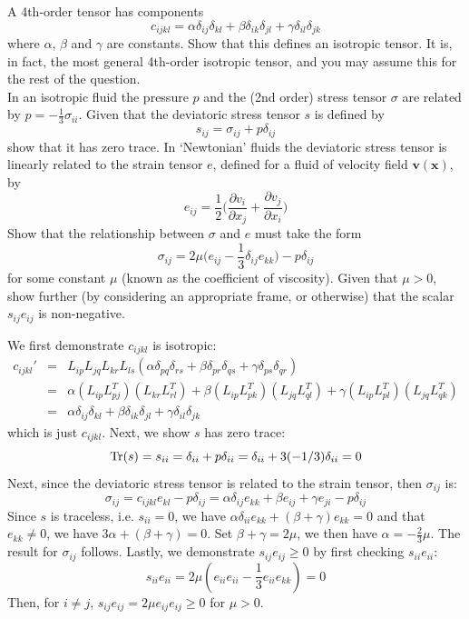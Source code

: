 \documentclass[a4paper]{article}
\begin{document}
\begin{qns}
A 4th-order tensor has components
$$c_{ijkl}=\alpha\delta_{ij}\delta_{kl}+\beta\delta_{ik}\delta_{jl}+\gamma\delta_{il}\delta_{jk}$$
where $\alpha$, $\beta$ and $\gamma$ are constants. Show that this defines an isotropic tensor. It is, in fact, the most general 4th-order isotropic tensor, and you may assume this for the rest of the question.\\[5pt]
In an isotropic fluid the pressure $p$ and the (2nd order) stress tensor $\sigma$ are related by $p=-\frac{1}{3}\sigma_{ii}$. Given that the deviatoric stress tensor $s$ is defined by
$$s_{ij}=\sigma_{ij}+p\delta_{ij}$$
show that it has zero trace. In `Newtonian' fluids the deviatoric stress tensor is linearly related to the strain tensor $e$, defined for a fluid of velocity field $\mathbf{v}(\mathbf{x})$, by
$$e_{ij}=\frac{1}{2}\bigg(\frac{\partial v_i}{\partial x_j}+\frac{\partial v_j}{\partial x_i}\bigg)$$
Show that the relationship between $\sigma$ and $e$ must take the form
$$\sigma_{ij}=2\mu\bigg(e_{ij}-\frac{1}{3}\delta_{ij}e_{kk}\bigg)-p\delta_{ij}$$
for some constant $\mu$ (known as the coefficient of viscosity). Given that $\mu>0$, show further (by considering an appropriate frame, or otherwise) that the scalar $s_{ij}e_{ij}$ is non-negative.
\end{qns}
\newpage
\begin{ans}
We first demonstrate $c_{ijkl}$ is isotropic:
\begin{eqnarray}
c_{ijkl}'&=&L_{ip}L_{jq}L_{kr}L_{ls}(\alpha\delta_{pq}\delta_{rs}+\beta\delta_{pr}\delta_{qs}+\gamma\delta_{ps}\delta_{qr})\nonumber\\&=&\alpha(L_{ip}L_{pj}^T)(L_{kr}L_{rl}^T)+\beta(L_{ip}L_{pk}^T)(L_{jq}L_{ql}^T)+\gamma(L_{ip}L_{pl}^T)(L_{jq}L_{qk}^T)\nonumber\\&=&\alpha\delta_{ij}\delta_{kl}+\beta\delta_{ik}\delta_{jl}+\gamma\delta_{il}\delta_{jk}\nonumber
\end{eqnarray}
which is just $c_{ijkl}$. Next, we show $s$ has zero trace:
$$\operatorname{Tr}(s)=s_{ii}=\delta_{ii}+p\delta_{ii}=\delta_{ii}+3(-1/3)\delta_{ii}=0$$
Next, since the deviatoric stress tensor is related to the strain tensor, then $\sigma_{ij}$ is: 
$$\sigma_{ij}=c_{ijkl}e_{kl}-p\delta_{ij}=\alpha\delta_{ij}e_{kk}+\beta e_{ij}+\gamma e_{ji}-p\delta_{ij}$$
Since $s$ is traceless, i.e. $s_{ii}=0$, we have $\alpha\delta_{ii}e_{kk}+(\beta+\gamma)e_{kk}=0$ and that $e_{kk}\neq0$, we have $3\alpha+(\beta+\gamma)=0$. Set $\beta+\gamma=2\mu$, we then have $\alpha=-\frac{2}{3}\mu$. The result for $\sigma_{ij}$ follows. Lastly, we demonstrate $s_{ij}e_{ij}\geq0$ by first checking $s_{ii}e_{ii}$:
$$s_{ii}e_{ii}=2\mu(e_{ii}e_{ii}-\frac{1}{3}e_{ii}e_{kk})=0$$
Then, for $i\neq j$, $s_{ij}e_{ij}=2\mu e_{ij}e_{ij}\geq 0$ for $\mu>0$. 
\end{ans}
\end{document}
